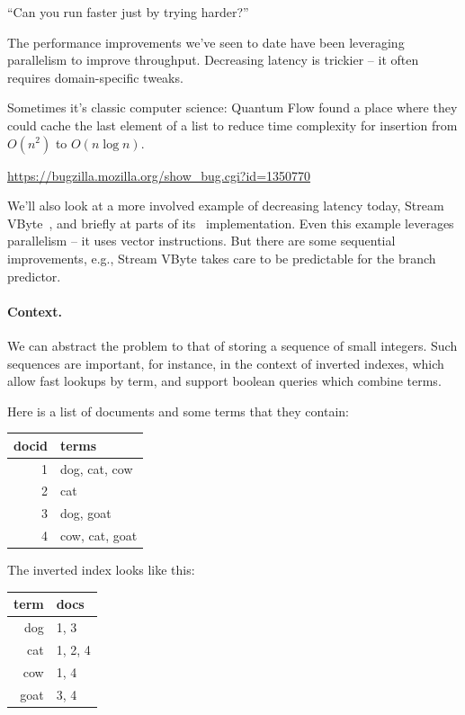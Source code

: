 \hfill ``Can you run faster just by trying harder?''

The performance improvements we've seen to date have been leveraging parallelism
to improve throughput. Decreasing latency is trickier -- it often requires domain-specific
tweaks.

Sometimes it's classic computer science: Quantum Flow found a place
where they could cache the last element of a list to reduce time
complexity for insertion from $O(n^2)$ to $O(n \log n)$.

\begin{center}
\url{https://bugzilla.mozilla.org/show_bug.cgi?id=1350770}
\end{center}

We'll also look at a more involved example of decreasing latency today, Stream VByte~\cite{LEMIRE20181}, and briefly at parts of its \CPP~implementation.
Even this example leverages parallelism -- it uses vector instructions. But there
are some sequential improvements, e.g., Stream VByte takes care to be predictable
for the branch predictor.

\paragraph{Context.} We can abstract the problem to that of storing a sequence of small integers.
Such sequences are important, for instance, in the context of inverted indexes, which allow
fast lookups by term, and support boolean queries which combine terms.

Here is a list of documents and some terms that they contain:
\begin{center}
\begin{tabular}{r|l}
docid & terms \\ \hline
1 & dog, cat, cow\\
2 & cat\\
3 & dog, goat\\
4 & cow, cat, goat\\
\end{tabular}
\end{center}

The inverted index looks like this:
\begin{center}
\begin{tabular}{r|l}
term & docs \\ \hline
dog & 1, 3 \\
cat & 1, 2, 4 \\
cow & 1, 4 \\
goat & 3, 4
\end{tabular}
\end{center}

